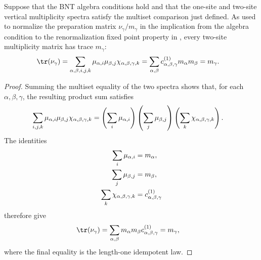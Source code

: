 \begin{lemma}%
    \label{thm:mpdo_bnt_multiplicity_trace_normalization}
    \leanok
    Suppose that the BNT algebra conditions hold and that the one-site and
    two-site vertical multiplicity spectra satisfy the multiset comparison
    just defined. As used to normalize the preparation matrix
    $\nu_\gamma/m_\gamma$ in the implication from the algebra condition to
    the renormalization fixed point property in
    \cite[Appendix~C.4, lines~2058--2064]{Cirac2016MPDO_arXiv}, every
    two-site multiplicity matrix has trace $m_\gamma$:
    \begin{align}
        \tr(\nu_\gamma)
         & =\sum_{\alpha,\beta,i,j,k}
        \mu_{\alpha,i}\mu_{\beta,j}
        \chi_{\alpha,\beta,\gamma,k}
        =\sum_{\alpha,\beta}
        c^{(1)}_{\alpha,\beta,\gamma}m_\alpha m_\beta
        =m_\gamma.
        \label{eq:rfp_trace_normalization}
    \end{align}
\end{lemma}
\begin{proof}\leanok
    Summing the multiset equality of the two spectra shows that, for each
    $\alpha,\beta,\gamma$, the resulting product sum satisfies
    \begin{align}
        \sum_{i,j,k}
        \mu_{\alpha,i}\mu_{\beta,j}\chi_{\alpha,\beta,\gamma,k}
         & =
        \left(\sum_i\mu_{\alpha,i}\right)
        \left(\sum_j\mu_{\beta,j}\right)
        \left(\sum_k\chi_{\alpha,\beta,\gamma,k}\right).
        \notag
    \end{align}
    The identities
    \begin{align}
        \sum_i\mu_{\alpha,i}
         & =m_\alpha,
        \notag                            \\
        \sum_j\mu_{\beta,j}
         & =m_\beta,
        \notag                            \\
        \sum_k\chi_{\alpha,\beta,\gamma,k}
         & =c^{(1)}_{\alpha,\beta,\gamma}
        \notag
    \end{align}
    therefore give
    \begin{align}
        \tr(\nu_\gamma)
         & =\sum_{\alpha,\beta}
        m_\alpha m_\beta c^{(1)}_{\alpha,\beta,\gamma}
        =m_\gamma,
        \notag
    \end{align}
    where the final equality is the length-one idempotent law.
\end{proof}

